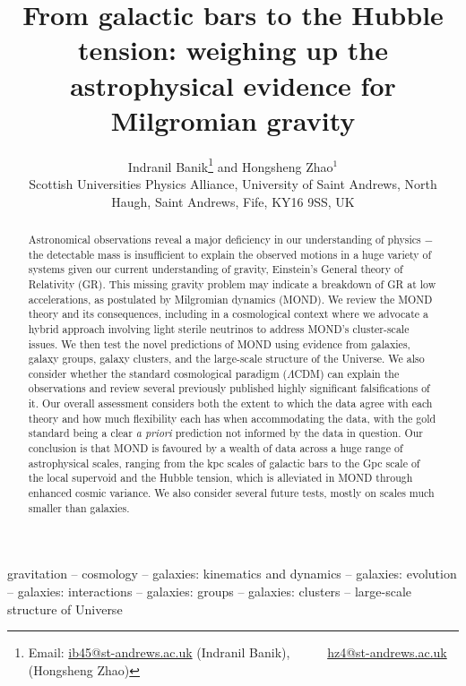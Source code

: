 \documentclass[fleqn,usenatbib,useAMS]{mnras} %
\title[Weighing up the astrophysical evidence for MOND]{From galactic bars to the Hubble tension: weighing up the astrophysical evidence for Milgromian gravity} %
\author[Indranil Banik \& Hongsheng Zhao]{Indranil Banik\thanks{Email: \href{mailto:ib45@st-andrews.ac.uk}{ib45@st-andrews.ac.uk} (Indranil Banik),\newline $~~~~~~~~~~~~$ \href{mailto:hz4@st-andrews.ac.uk}{hz4@st-andrews.ac.uk} (Hongsheng Zhao)} and Hongsheng Zhao$^{1}$ \vspace{10pt} \\
Scottish Universities Physics Alliance, University of Saint Andrews, North Haugh, Saint Andrews, Fife, KY16 9SS, UK}
\begin{document}
\label{firstpage}
\pagerange{\pageref{firstpage}--\pageref{lastpage}}

\maketitle

\begin{abstract} %
Astronomical observations reveal a major deficiency in our understanding of physics $-$ the detectable mass is insufficient to explain the observed motions in a huge variety of systems given our current understanding of gravity, Einstein's General theory of Relativity (GR). This missing gravity problem may indicate a breakdown of GR at low accelerations, as postulated by Milgromian dynamics (MOND). We review the MOND theory and its consequences, including in a cosmological context where we advocate a hybrid approach involving light sterile neutrinos to address MOND's cluster-scale issues. We then test the novel predictions of MOND using evidence from galaxies, galaxy groups, galaxy clusters, and the large-scale structure of the Universe. We also consider whether the standard cosmological paradigm ($\Lambda$CDM) can explain the observations and review several previously published highly significant falsifications of it. Our overall assessment considers both the extent to which the data agree with each theory and how much flexibility each has when accommodating the data, with the gold standard being a clear \emph{a priori} prediction not informed by the data in question. Our conclusion is that MOND is favoured by a wealth of data across a huge range of astrophysical scales, ranging from the kpc scales of galactic bars to the Gpc scale of the local supervoid and the Hubble tension, which is alleviated in MOND through enhanced cosmic variance. We also consider several future tests, mostly on scales much smaller than galaxies.


\end{abstract}

\begin{keywords}
	gravitation -- cosmology -- galaxies: kinematics and dynamics -- galaxies: evolution -- galaxies: interactions -- galaxies: groups -- galaxies: clusters -- large-scale structure of Universe
\end{keywords}
\end{document}
